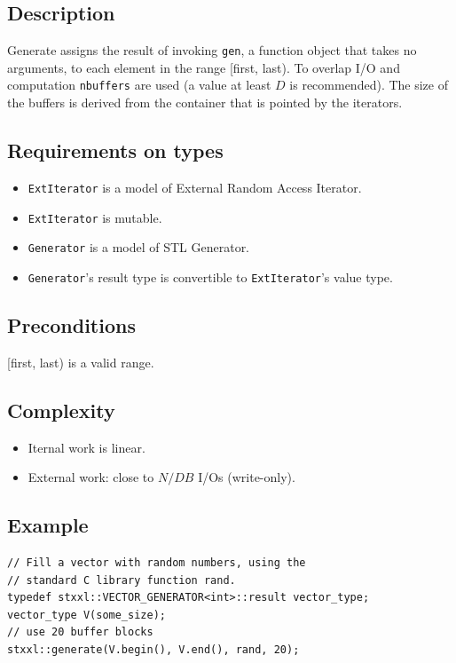 \documentclass[twoside]{book}
\begin{document}
\subsection*{Description}
Generate assigns the result of invoking \texttt{gen}, a function
object that 
takes no arguments, to each element in the range [first, last). To
overlap I/O and computation \texttt{nbuffers} are used (a value at
least $D$ is recommended). The size of
the buffers is derived from the container that is pointed by the
iterators. 
\subsection*{Requirements on types}
\begin{itemize}
\item \texttt{ExtIterator} is a model of External Random Access
Iterator.
\item \texttt{ExtIterator} is mutable.
\item \texttt{Generator} is a model of STL Generator.
\item \texttt{Generator}'s result type is convertible to
\texttt{ExtIterator}'s 
value type.
\end{itemize}
\subsection*{Preconditions}
[first, last) is a valid range.
\subsection*{Complexity}
\begin{itemize}
\item Iternal work is linear.
\item External work: close to $N/DB$ I/Os (write-only).
\end{itemize}

\subsection*{Example}
\begin{lstlisting}
// Fill a vector with random numbers, using the 
// standard C library function rand.
typedef stxxl::VECTOR_GENERATOR<int>::result vector_type;
vector_type V(some_size);
// use 20 buffer blocks
stxxl::generate(V.begin(), V.end(), rand, 20);
\end{lstlisting}
\newcommand{\xforeach}{{\texttt{stxxl::for\_each}}}
\end{document}
